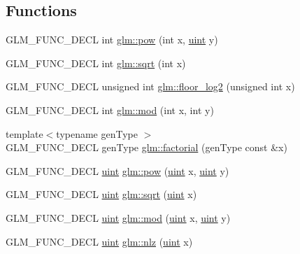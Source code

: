 \subsection*{Functions}
\begin{DoxyCompactItemize}
\item 
G\+L\+M\+\_\+\+F\+U\+N\+C\+\_\+\+D\+E\+CL int \hyperlink{group__gtx__integer_ga4937910d5d82dfd9c4bab3da7ff75399}{glm\+::pow} (int x, \hyperlink{group__core__precision_ga4fd29415871152bfb5abd588334147c8}{uint} y)
\item 
G\+L\+M\+\_\+\+F\+U\+N\+C\+\_\+\+D\+E\+CL int \hyperlink{group__gtx__integer_ga78e2e68330e91d350fcfc2f4831cad12}{glm\+::sqrt} (int x)
\item 
G\+L\+M\+\_\+\+F\+U\+N\+C\+\_\+\+D\+E\+CL unsigned int \hyperlink{group__gtx__integer_ga7011b4e1c1e1ed492149b028feacc00e}{glm\+::floor\+\_\+log2} (unsigned int x)
\item 
G\+L\+M\+\_\+\+F\+U\+N\+C\+\_\+\+D\+E\+CL int \hyperlink{group__gtx__integer_gab9d22df91aac4d9eb925a4910f556f1b}{glm\+::mod} (int x, int y)
\item 
{\footnotesize template$<$typename gen\+Type $>$ }\\G\+L\+M\+\_\+\+F\+U\+N\+C\+\_\+\+D\+E\+CL gen\+Type \hyperlink{group__gtx__integer_ga8cbd3120905f398ec321b5d1836e08fb}{glm\+::factorial} (gen\+Type const \&x)
\item 
G\+L\+M\+\_\+\+F\+U\+N\+C\+\_\+\+D\+E\+CL \hyperlink{group__core__precision_ga4fd29415871152bfb5abd588334147c8}{uint} \hyperlink{group__gtx__integer_gaa8229e850c3cc4ad83492fe390ada044}{glm\+::pow} (\hyperlink{group__core__precision_ga4fd29415871152bfb5abd588334147c8}{uint} x, \hyperlink{group__core__precision_ga4fd29415871152bfb5abd588334147c8}{uint} y)
\item 
G\+L\+M\+\_\+\+F\+U\+N\+C\+\_\+\+D\+E\+CL \hyperlink{group__core__precision_ga4fd29415871152bfb5abd588334147c8}{uint} \hyperlink{group__gtx__integer_ga457e9efca8339bf918d319e9c55f7c8f}{glm\+::sqrt} (\hyperlink{group__core__precision_ga4fd29415871152bfb5abd588334147c8}{uint} x)
\item 
G\+L\+M\+\_\+\+F\+U\+N\+C\+\_\+\+D\+E\+CL \hyperlink{group__core__precision_ga4fd29415871152bfb5abd588334147c8}{uint} \hyperlink{group__gtx__integer_gab8f9ec0ca93ca90669434224818f0750}{glm\+::mod} (\hyperlink{group__core__precision_ga4fd29415871152bfb5abd588334147c8}{uint} x, \hyperlink{group__core__precision_ga4fd29415871152bfb5abd588334147c8}{uint} y)
\item 
G\+L\+M\+\_\+\+F\+U\+N\+C\+\_\+\+D\+E\+CL \hyperlink{group__core__precision_ga4fd29415871152bfb5abd588334147c8}{uint} \hyperlink{group__gtx__integer_gacbe62fd2384464c16ea30ecc4defc11c}{glm\+::nlz} (\hyperlink{group__core__precision_ga4fd29415871152bfb5abd588334147c8}{uint} x)
\end{DoxyCompactItemize}


